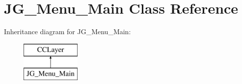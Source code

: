\hypertarget{class_j_g___menu___main}{\section{J\-G\-\_\-\-Menu\-\_\-\-Main Class Reference}
\label{class_j_g___menu___main}
}
Inheritance diagram for J\-G\-\_\-\-Menu\-\_\-\-Main\-:\begin{figure}[H]
\begin{center}
\leavevmode
\includegraphics[height=2.000000cm]{class_j_g___menu___main}
\end{center}
\end{figure}
